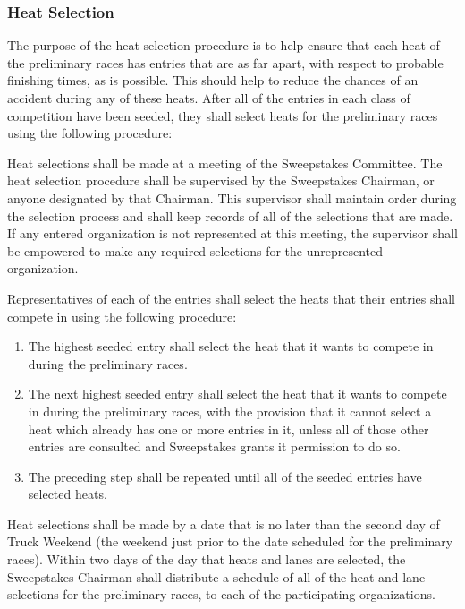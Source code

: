 \subsubsection{Heat Selection}

	The purpose of the heat selection procedure is to help ensure that each heat of the preliminary races has entries that are as far apart, with respect to probable finishing times, as is possible. This should help to reduce the chances of an accident during any of these heats. After all of the entries in each class of competition have been seeded, they shall select heats for the preliminary races using the following procedure:

	Heat selections shall be made at a meeting of the Sweepstakes Committee. The heat selection procedure shall be supervised by the Sweepstakes Chairman, or anyone designated by that Chairman. This supervisor shall maintain order during the selection process and shall keep records of all of the selections that are made. If any entered organization is not represented at this meeting, the supervisor shall be empowered to make any required selections for the unrepresented organization.


	Representatives of each of the entries shall select the heats that their entries shall compete in using the following procedure:

	\begin{enumerate}

		\item
		The highest seeded entry shall select the heat that it wants to compete in during the preliminary races.

		\item
		The next highest seeded entry shall select the heat that it wants to compete in during the preliminary races, with the provision that it cannot select a heat which already has one or more entries in it, unless all of those other entries are consulted and Sweepstakes grants it permission to do so.

		\item
		The preceding step shall be repeated until all of the seeded entries have selected heats.

	\end{enumerate}

	Heat selections shall be made by a date that is no later than the second day of Truck Weekend (the weekend just prior to the date scheduled for the preliminary races). Within two days of the day that heats and lanes are selected, the Sweepstakes Chairman shall distribute a schedule of all of the heat and lane selections for the preliminary races, to each of the participating organizations.

